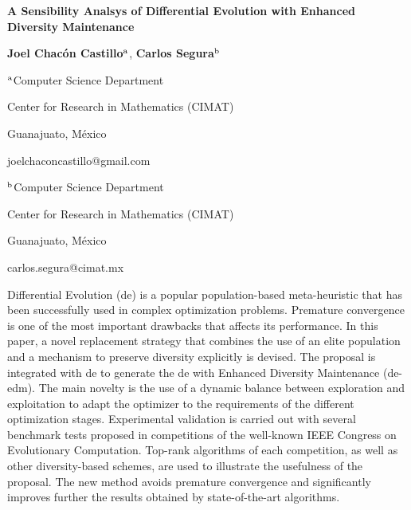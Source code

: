 \documentclass[a4paper,12pt]{article}
\newcommand{\DE}{{\sc de}}
\newcommand{\DEEDM}{{\sc de-edm}}
\begin{document}
\centerline{\bf A Sensibility Analsys of Differential Evolution with Enhanced Diversity Maintenance}

\vspace{12pt}

\centerline{{\bf Joel Chac\'on Castillo$^{\rm a}$},  {\bf Carlos Segura$^{\rm b}$}}

\vspace{12pt}

\centerline{$^{\rm a}$Computer Science Department}
\centerline{Center for Research in Mathematics (CIMAT)}
\centerline{Guanajuato, M\'exico}
\centerline{joelchaconcastillo@gmail.com}

\vspace{12pt}

\centerline{$^{\rm b}$Computer Science Department}
\centerline{Center for Research in Mathematics (CIMAT)}
\centerline{Guanajuato, M\'exico}
\centerline{carlos.segura@cimat.mx}

\vspace{12pt}
\vspace{12pt}

Differential Evolution (\DE{}) is a popular population-based meta-heuristic that has been successfully used in complex 
optimization problems.
%
Premature convergence is one of the most important drawbacks that affects its performance.
%
In this paper, a novel replacement strategy that combines the use of an elite population and a mechanism to preserve 
diversity explicitly is devised.
%
The proposal is integrated with \DE{} to generate the \DE{} with Enhanced Diversity Maintenance (\DEEDM{}).
%
The main novelty is the use of a dynamic balance between exploration and exploitation to adapt the optimizer to the 
requirements of the different optimization stages.
%
Experimental validation is carried out with several benchmark tests proposed in competitions of the well-known IEEE Congress on 
Evolutionary Computation.
%
Top-rank algorithms of each competition, as well as other diversity-based schemes, 
are used to illustrate the usefulness of the proposal.
%
The new method avoids premature convergence and significantly improves further the results obtained by state-of-the-art algorithms.




% 
% 


\end{document}
